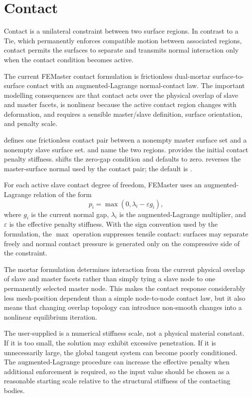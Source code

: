 \section{Contact}
\label{sec:contact}

Contact is a unilateral constraint between two surface regions. In contrast to a Tie, which permanently enforces compatible motion between associated regions, contact permits the surfaces to separate and transmits normal interaction only when the contact condition becomes active.

The current FEMaster contact formulation is frictionless dual-mortar surface-to-surface contact with an augmented-Lagrange normal-contact law. The important modelling consequences are that contact acts over the physical overlap of slave and master facets, is nonlinear because the active contact region changes with deformation, and requires a sensible master/slave definition, surface orientation, and penalty scale.


 defines one frictionless contact pair between a nonempty master surface set and a nonempty slave surface set.  and  name the two regions.  provides the initial contact penalty stiffness.  shifts the zero-gap condition and defaults to zero.  reverses the master-surface normal used by the contact pair; the default is .

For each active slave contact degree of freedom, FEMaster uses an augmented-Lagrange relation of the form
\[
p_i=\max\left(0,\lambda_i-\varepsilon g_i\right),
\]
where \(g_i\) is the current normal gap, \(\lambda_i\) is the augmented-Lagrange multiplier, and \(\varepsilon\) is the effective penalty stiffness. With the sign convention used by the formulation, the \(\max\) operation suppresses tensile contact: surfaces may separate freely and normal contact pressure is generated only on the compressive side of the constraint.

The mortar formulation determines interaction from the current physical overlap of slave and master facets rather than simply tying a slave node to one permanently selected master node. This makes the contact response considerably less mesh-position dependent than a simple node-to-node contact law, but it also means that changing overlap topology can introduce non-smooth changes into a nonlinear equilibrium iteration.

The user-supplied  is a numerical stiffness scale, not a physical material constant. If it is too small, the solution may exhibit excessive penetration. If it is unnecessarily large, the global tangent system can become poorly conditioned. The augmented-Lagrange procedure can increase the effective penalty when additional enforcement is required, so the input value should be chosen as a reasonable starting scale relative to the structural stiffness of the contacting bodies.

